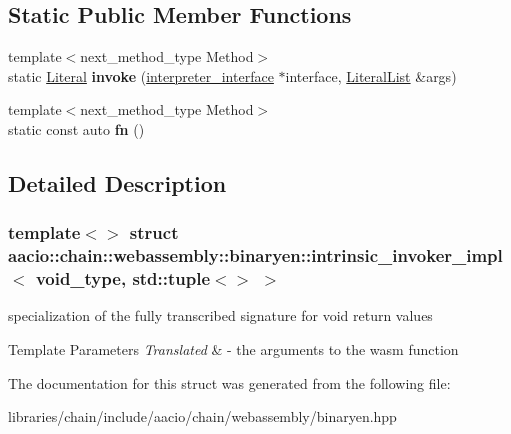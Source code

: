 \subsection*{Static Public Member Functions}
\begin{DoxyCompactItemize}
\item 
\mbox{\label{structaacio_1_1chain_1_1webassembly_1_1binaryen_1_1intrinsic__invoker__impl_3_01void__type_00_01std_1_1tuple_3_4_01_4_a8e67b0c0bf79992da1378fa1b16f0874}} 
{\footnotesize template$<$next\+\_\+method\+\_\+type Method$>$ }\\static \mbox{\hyperlink{classwasm_1_1_literal}{Literal}} {\bfseries invoke} (\mbox{\hyperlink{structaacio_1_1chain_1_1webassembly_1_1binaryen_1_1interpreter__interface}{interpreter\+\_\+interface}} $\ast$interface, \mbox{\hyperlink{classstd_1_1vector}{Literal\+List}} \&args)
\item 
\mbox{\label{structaacio_1_1chain_1_1webassembly_1_1binaryen_1_1intrinsic__invoker__impl_3_01void__type_00_01std_1_1tuple_3_4_01_4_a2472e5cbb1555a2e6b1ff4fe5b2d257f}} 
{\footnotesize template$<$next\+\_\+method\+\_\+type Method$>$ }\\static const auto {\bfseries fn} ()
\end{DoxyCompactItemize}


\subsection{Detailed Description}
\subsubsection*{template$<$$>$\newline
struct aacio\+::chain\+::webassembly\+::binaryen\+::intrinsic\+\_\+invoker\+\_\+impl$<$ void\+\_\+type, std\+::tuple$<$$>$ $>$}

specialization of the fully transcribed signature for void return values 
\begin{DoxyTemplParams}{Template Parameters}
{\em Translated} & -\/ the arguments to the wasm function \\
\hline
\end{DoxyTemplParams}


The documentation for this struct was generated from the following file\+:\begin{DoxyCompactItemize}
\item 
libraries/chain/include/aacio/chain/webassembly/binaryen.\+hpp\end{DoxyCompactItemize}

